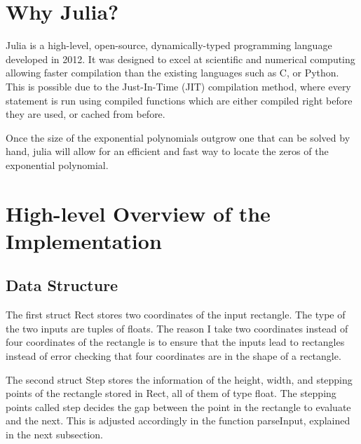 \documentclass[11pt,reqno,oneside,a4paper]{article}
\begin{document}
\section{Why Julia?}
Julia is a high-level, open-source, dynamically-typed programming language developed in 2012.
It was designed to excel at scientific and numerical computing allowing faster compilation than the existing languages such as C, or Python.
This is possible due to the Just-In-Time (JIT) compilation method, where every statement is run using compiled functions which are either compiled right before they are used, or cached from before.

Once the size of the exponential polynomials outgrow one that can be solved by hand, julia will allow for an efficient and fast way to locate the zeros of the exponential polynomial.


\section{High-level Overview of the Implementation}
\subsection{Data Structure}
	The first struct Rect stores two coordinates of the input rectangle. 
	The type of the two inputs are tuples of floats.
	The reason I take two coordinates instead of four coordinates of the rectangle is to ensure that the inputs lead to rectangles instead of error checking that four coordinates are in the shape of a rectangle. 
	
	The second struct Step stores the information of the height, width, and stepping points of the rectangle stored in Rect, all of them of type float.
	The stepping points called step decides the gap between the point in the rectangle to evaluate and the next. 
	This is adjusted accordingly in the function parseInput, explained in the next subsection. 
	
\end{document}
